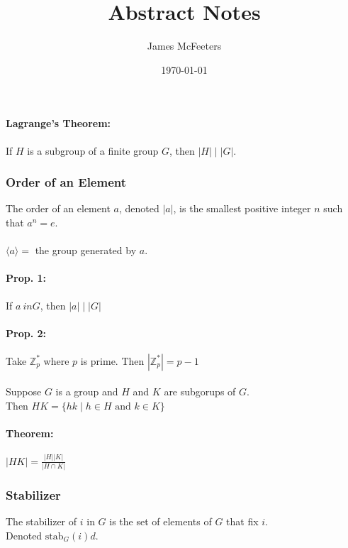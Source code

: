 \documentclass[11pt, twoside, letterpaper]{article}
\newcommand{\ord}[1]{|{#1}|}
\newcommand{\stab}{\mathrm{stab}}
\newcommand{\ordiv}[2]{\ord{{#1}} \mid \ord{{#2}}}
\newcommand{\genby}[1]{\langle {#1} \rangle}
\begin{document}
\title{Abstract Notes}
\author{James McFeeters}
\date{\today}
\maketitle


\paragraph{Lagrange's Theorem: }
	If $H$ is a subgroup of a finite group $G$, then $\ordiv{H}{G}$.

\subsubsection{Order of an Element}
	The order of an element $a$, denoted $\ord{a}$, is the smallest positive integer $n$ such that $a^n = e$.

\paragraph{}
	$\genby{a} = $ the group generated by $a$.

\paragraph{Prop. 1: }
	If $a \ in G$, then $\ordiv{a}{G}$

\paragraph{Prop. 2: }
	Take $\mathbb{Z}_p^*$ where $p$ is prime.
	Then $\ord{\mathbb{Z}_p^*} = p-1$
\paragraph{}
	Suppose $G$ is a group and $H$ and $K$ are subgorups of $G$. \\
	Then $HK = \{ hk \mid h \in H \text{ and } k \in K \}$

\paragraph{Theorem: }
	$\ord{HK} = \displaystyle\frac{\ord{H}\ord{K}}{\ord{H \cap K}}$

\subsubsection{Stabilizer}
	The stabilizer of $i$ in $G$ is the set of elements of $G$ that fix $i$. \\
	Denoted $\stab_G (i)d$.
\end{document}
